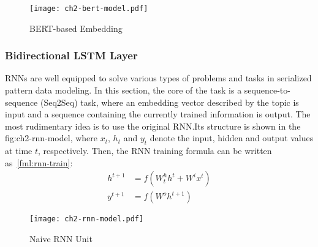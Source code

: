 \begin{figure}[H]
	\centering
	\texttt{[image: ch2-bert-model.pdf]}
	\caption{BERT-based Embedding}\label{fig:ch2-bert-model}
\end{figure}

\subsubsection{Bidirectional LSTM Layer}

RNNs are well equipped to solve various types of problems and tasks in serialized pattern data modeling. In this section, the core of the task is a sequence-to-sequence (Seq2Seq) task, where an embedding vector described by the topic is input and a sequence containing the currently trained information is output. The most rudimentary idea is to use the original RNN.\@ Its structure is shown in the \figurename{fig:ch2-rnn-model}, where \(x_t\), \(h_t\) and \(y_t\) denote the input, hidden and output values at time \(t\), respectively. Then, the RNN training formula can be written as~\ref{fml:rnn-train}:
\begin{equation}
	\begin{align}\label{fml:rnn-train}
		h^{t+1} & =f(W^h_{t} h^t+W^i x^t) \\
		y^{t+1} & =f(W^o h^{t+1})
	\end{align}
\end{equation}

\begin{figure}[H]
	\centering
	\texttt{[image: ch2-rnn-model.pdf]}
	\caption{Naive RNN Unit}\label{fig:ch2-rnn-model}
\end{figure}


